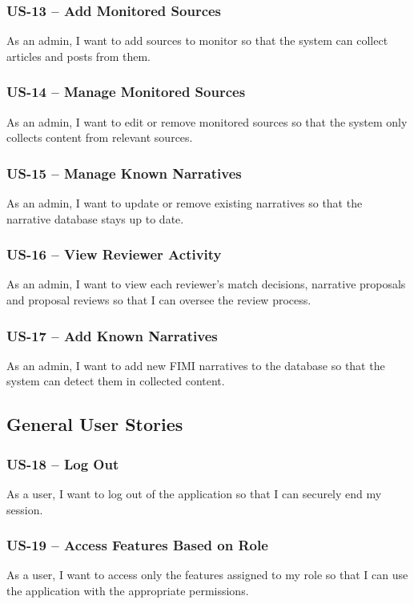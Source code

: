 \documentclass[12pt,a4paper]{article}
\begin{document}
\subsubsection*{US-13 -- Add Monitored Sources}
As an admin, I want to add sources to monitor so that the system can collect articles and posts from them.

\subsubsection*{US-14 -- Manage Monitored Sources}

As an admin, I want to edit or remove monitored sources so that the system only collects content from relevant sources.

\subsubsection*{US-15 -- Manage Known Narratives}

As an admin, I want to update or remove existing narratives so that the narrative database stays up to date.

\subsubsection* {US-16 -- View Reviewer Activity}
As an admin, I want to view each reviewer's match decisions, narrative proposals
and proposal reviews so that I can oversee the review process.

\subsubsection*{US-17 -- Add Known Narratives}

As an admin, I want to add new FIMI narratives to the database so that the system can detect them in collected content.

\subsection{General User Stories}

\subsubsection*{US-18 -- Log Out}
As a user, I want to log out of the application so that I can securely end my session.

\subsubsection*{US-19 -- Access Features Based on Role}
As a user, I want to access only the features assigned to my role so that I can use the application with the appropriate permissions.
\end{document}

